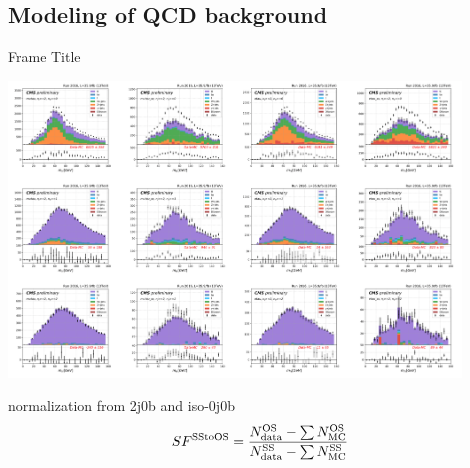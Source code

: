 \subsection{Modeling of QCD background}
\begin{frame}{Frame Title}

    \begin{center}
        \includegraphics[width=0.9\textwidth, trim=0 21cm 32cm 18cm, clip]{chapters/Analysis/sectionBackground/figures/ltau_kinematics/ltau2.png}
    \end{center}
    
    normalization from 2j0b and iso-0j0b
    \begin{equation}
    SF^{\rm SS \to OS} = \frac{N^{\rm OS}_{\rm data} - \sum N^{\rm OS}_{\rm MC} }{ N^{\rm SS}_{\rm data} - \sum N^{\rm SS}_{\rm MC} }
    \end{equation}

\end{frame}


